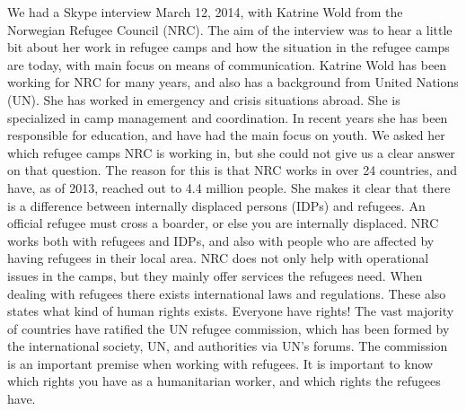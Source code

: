 We had a Skype interview March 12, 2014, with Katrine Wold from the Norwegian Refugee Council (NRC). The aim of the interview was to hear a little bit about her work in refugee camps and how the situation in the refugee camps are today, with main focus on means of communication.
Katrine Wold has been working for NRC for many years, and also has a background from United Nations (UN). She has worked in emergency and crisis situations abroad. She is specialized in camp management and coordination. In recent years she has been responsible for education, and have had the main focus on youth. We asked her which refugee camps NRC is working in, but she could not give us a clear answer on that question. The reason for this is that NRC works in over 24 countries, and have, as of 2013, reached out to 4.4 million people. She makes it clear that there is a difference between internally displaced persons (IDPs) and refugees. An official refugee must cross a boarder, or else you are internally displaced. NRC works both with refugees and IDPs, and also with people who are affected by having refugees in their local area. NRC does not only help with operational issues in the camps, but they mainly offer services the refugees need. When dealing with refugees there exists international laws and regulations. These also states what kind of human rights exists. Everyone have rights! The vast majority of countries have ratified the UN refugee commission, which has been formed by the international society, UN, and authorities via UN's forums. The commission is an important premise when working with refugees. It is important to know which rights you have as a humanitarian worker, and which rights the refugees have. 

